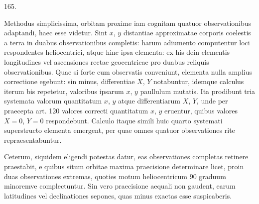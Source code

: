 \begin{center}\hypertarget{native-228-article165}{}165.\end{center}
Methodus simplicissima, orbitam proxime iam cognitam quatuor observationibus
adaptandi, haec esse videtur. Sint $x$, $y$ distantiae approximatae corporis
coelestis a terra in duabus observationibus completis: harum adiumento
computentur loci respondentes heliocentrici, atque hinc ipsa elementa: ex his
dein elementis longitudines vel ascensiones rectae geocentricae pro duabus
reliquis observationibus. Quae si forte cum observatis conveniunt, elementa
nulla amplius correctione egebunt: sin minus, differentiae $X$, $Y$ notabuntur,
idemque calculus iterum bis repetetur, valoribus ipsarum $x$, $y$ paullulum mutatis.
Ita prodibunt tria systemata valorum quantitatum $x$, $y$ atque differentiarum
$X$, $Y$, unde per praecepta art. 120 valores correcti quantitatum $x$, $y$
eruentur, quibus valores $X=0$, $Y=0$ respondebunt. Calculo itaque simili huic
quarto systemati superstructo elementa emergent, per quae omnes quatuor
observationes rite repraesentabuntur.

Ceterum, siquidem eligendi potestas datur, eas observationes completas retinere
praestabit, e quibus situm orbitae maxima praecisione determinare licet, proin
duas observationes extremas, quoties motum heliocentricum $90$ graduum minoremve
complectuntur. Sin vero praecisione aequali non gaudent, earum latitudines vel
declinationes sepones, quas minus exactas esse suspicaberis.
